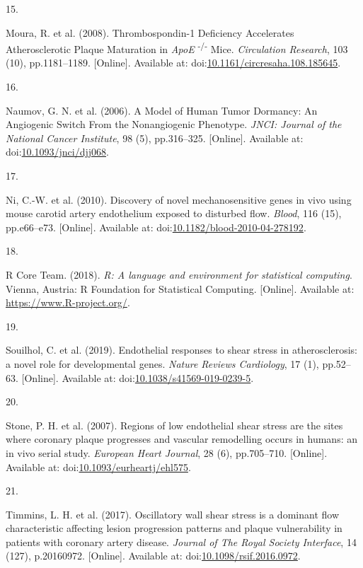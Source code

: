 \documentclass[
  11pt,
]{article}
\newlength{\cslhangindent}
\newlength{\csllabelwidth}
\newlength{\cslentryspacingunit} %
\newenvironment{CSLReferences}[2] %
 {%
  \setlength{\parindent}{0pt}
  \ifodd #1
  \let\oldpar\par
  \def\par{\hangindent=\cslhangindent\oldpar}
  \fi
  \setlength{\parskip}{#2\cslentryspacingunit}
 }%
 {}
\newcommand{\CSLLeftMargin}[1]{\parbox[t]{\csllabelwidth}{#1}}
\newcommand{\CSLRightInline}[1]{\parbox[t]{\linewidth - \csllabelwidth}{#1}\break}
\begin{document}
\begin{CSLReferences}{0}{0}
\leavevmode{}%
\CSLLeftMargin{15. }
\CSLRightInline{Moura, R. {et al.} (2008). {Thrombospondin-1 Deficiency Accelerates Atherosclerotic Plaque Maturation in {\emph{ApoE}} {\textsuperscript{{-}/{-}}} Mice}. \emph{Circulation Research}, 103 (10), pp.1181--1189. {[}Online{]}. Available at: doi:\href{https://doi.org/10.1161/circresaha.108.185645}{10.1161/circresaha.108.185645}.}

\leavevmode{}%
\CSLLeftMargin{16. }
\CSLRightInline{Naumov, G. N. {et al.} (2006). {A Model of Human Tumor Dormancy: An Angiogenic Switch From the Nonangiogenic Phenotype}. \emph{JNCI: Journal of the National Cancer Institute}, 98 (5), pp.316--325. {[}Online{]}. Available at: doi:\href{https://doi.org/10.1093/jnci/djj068}{10.1093/jnci/djj068}.}

\leavevmode{}%
\CSLLeftMargin{17. }
\CSLRightInline{Ni, C.-W. {et al.} (2010). {Discovery of novel mechanosensitive genes in vivo using mouse carotid artery endothelium exposed to disturbed flow}. \emph{Blood}, 116 (15), pp.e66--e73. {[}Online{]}. Available at: doi:\href{https://doi.org/10.1182/blood-2010-04-278192}{10.1182/blood-2010-04-278192}.}

\leavevmode{}%
\CSLLeftMargin{18. }
\CSLRightInline{R Core Team. (2018). {\emph{R: A language and environment for statistical computing}}. Vienna, Austria: R Foundation for Statistical Computing. {[}Online{]}. Available at: \url{https://www.R-project.org/}.}

\leavevmode{}%
\CSLLeftMargin{19. }
\CSLRightInline{Souilhol, C. {et al.} (2019). {Endothelial responses to shear stress in atherosclerosis: a novel role for developmental genes}. \emph{Nature Reviews Cardiology}, 17 (1), pp.52--63. {[}Online{]}. Available at: doi:\href{https://doi.org/10.1038/s41569-019-0239-5}{10.1038/s41569-019-0239-5}.}

\leavevmode{}%
\CSLLeftMargin{20. }
\CSLRightInline{Stone, P. H. {et al.} (2007). {Regions of low endothelial shear stress are the sites where coronary plaque progresses and vascular remodelling occurs in humans: an in vivo serial study}. \emph{European Heart Journal}, 28 (6), pp.705--710. {[}Online{]}. Available at: doi:\href{https://doi.org/10.1093/eurheartj/ehl575}{10.1093/eurheartj/ehl575}.}

\leavevmode{}%
\CSLLeftMargin{21. }
\CSLRightInline{Timmins, L. H. {et al.} (2017). {Oscillatory wall shear stress is a dominant flow characteristic affecting lesion progression patterns and plaque vulnerability in patients with coronary artery disease}. \emph{Journal of The Royal Society Interface}, 14 (127), p.20160972. {[}Online{]}. Available at: doi:\href{https://doi.org/10.1098/rsif.2016.0972}{10.1098/rsif.2016.0972}.}


\end{CSLReferences}
\end{document}
